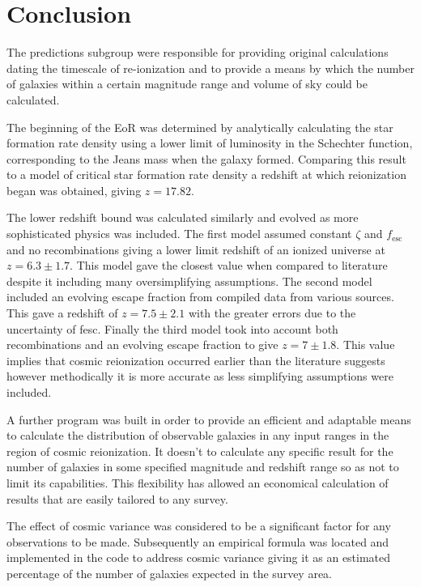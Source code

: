 \newpage
\section{Conclusion} %
\label{sec:conclusion}
	The predictions subgroup were responsible for providing original calculations dating the timescale of re-ionization and to provide a means by which the number of galaxies within a certain magnitude range and volume of sky could be calculated.

	The beginning of the EoR was determined by analytically calculating the star formation rate density using a lower limit of luminosity in the Schechter function, corresponding to the Jeans mass when the galaxy formed. Comparing this result to a model of critical star formation rate density a redshift at which reionization began was obtained, giving $z=17.82$.

	The lower redshift bound was calculated similarly and evolved as more sophisticated physics was included. The first model assumed constant $\zeta$ and $f_\text{esc}$ and no recombinations giving a lower limit redshift of an ionized universe at $z=6.3\pm 1.7$. This model gave the closest value when compared to literature despite it including many oversimplifying assumptions. The second model included an evolving escape fraction from compiled data from various sources. This gave a redshift of $z=7.5\pm 2.1$ with the greater errors due to the uncertainty of fesc. Finally the third model took into account both recombinations and an evolving escape fraction to give $z=7\pm 1.8$. This value implies that cosmic reionization occurred earlier than the literature suggests however methodically it is more accurate as less simplifying assumptions were included.

	A further program was built in order to provide an efficient and adaptable means to calculate the distribution of observable galaxies in any input ranges in the region of cosmic reionization. It doesn't to calculate any specific result for the number of galaxies in some specified magnitude and redshift range so as not to limit its capabilities. This flexibility has allowed an economical calculation of results that are easily tailored to any survey.

	The effect of cosmic variance was considered to be a significant factor for any observations to be made.
	Subsequently an empirical formula was located and implemented in the code to address cosmic variance giving it as an estimated percentage of the number of galaxies expected in the survey area.
